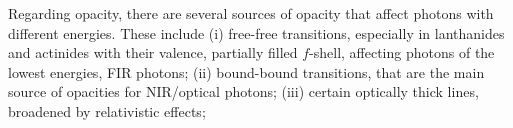 Regarding opacity, there are several sources of opacity that affect photons with
different energies. These include 
(i) free-free transitions, especially in lanthanides and actinides with their 
valence, partially filled $f$-shell, affecting photons of the lowest energies, 
\ac{FIR} photons; 
%
(ii) bound-bound transitions, that are the main source of opacities for 
\ac{NIR}/optical photons; 
(iii) certain optically thick lines, broadened by relativistic effects; 
